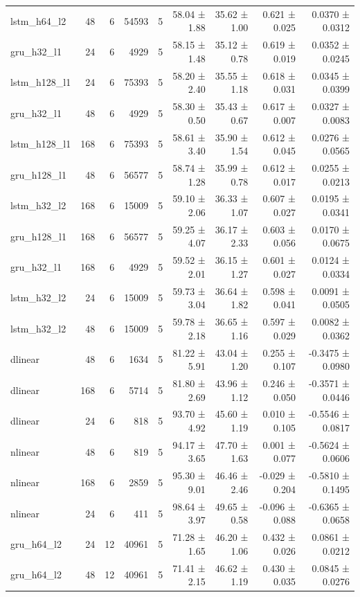 \begin{table}[htbp]
\begin{tabular}{lrrrrrrrr}
lstm\_h64\_l2 & 48 & 6 & 54593 & 5 & 58.04 ± 1.88 & 35.62 ± 1.00 & 0.621 ± 0.025 & 0.0370 ± 0.0312 \\
gru\_h32\_l1 & 24 & 6 & 4929 & 5 & 58.15 ± 1.48 & 35.12 ± 0.78 & 0.619 ± 0.019 & 0.0352 ± 0.0245 \\
lstm\_h128\_l1 & 24 & 6 & 75393 & 5 & 58.20 ± 2.40 & 35.55 ± 1.18 & 0.618 ± 0.031 & 0.0345 ± 0.0399 \\
gru\_h32\_l1 & 48 & 6 & 4929 & 5 & 58.30 ± 0.50 & 35.43 ± 0.67 & 0.617 ± 0.007 & 0.0327 ± 0.0083 \\
lstm\_h128\_l1 & 168 & 6 & 75393 & 5 & 58.61 ± 3.40 & 35.90 ± 1.54 & 0.612 ± 0.045 & 0.0276 ± 0.0565 \\
gru\_h128\_l1 & 48 & 6 & 56577 & 5 & 58.74 ± 1.28 & 35.99 ± 0.78 & 0.612 ± 0.017 & 0.0255 ± 0.0213 \\
lstm\_h32\_l2 & 168 & 6 & 15009 & 5 & 59.10 ± 2.06 & 36.33 ± 1.07 & 0.607 ± 0.027 & 0.0195 ± 0.0341 \\
gru\_h128\_l1 & 168 & 6 & 56577 & 5 & 59.25 ± 4.07 & 36.17 ± 2.33 & 0.603 ± 0.056 & 0.0170 ± 0.0675 \\
gru\_h32\_l1 & 168 & 6 & 4929 & 5 & 59.52 ± 2.01 & 36.15 ± 1.27 & 0.601 ± 0.027 & 0.0124 ± 0.0334 \\
lstm\_h32\_l2 & 24 & 6 & 15009 & 5 & 59.73 ± 3.04 & 36.64 ± 1.82 & 0.598 ± 0.041 & 0.0091 ± 0.0505 \\
lstm\_h32\_l2 & 48 & 6 & 15009 & 5 & 59.78 ± 2.18 & 36.65 ± 1.16 & 0.597 ± 0.029 & 0.0082 ± 0.0362 \\
dlinear & 48 & 6 & 1634 & 5 & 81.22 ± 5.91 & 43.04 ± 1.20 & 0.255 ± 0.107 & -0.3475 ± 0.0980 \\
dlinear & 168 & 6 & 5714 & 5 & 81.80 ± 2.69 & 43.96 ± 1.12 & 0.246 ± 0.050 & -0.3571 ± 0.0446 \\
dlinear & 24 & 6 & 818 & 5 & 93.70 ± 4.92 & 45.60 ± 1.19 & 0.010 ± 0.105 & -0.5546 ± 0.0817 \\
nlinear & 48 & 6 & 819 & 5 & 94.17 ± 3.65 & 47.70 ± 1.63 & 0.001 ± 0.077 & -0.5624 ± 0.0606 \\
nlinear & 168 & 6 & 2859 & 5 & 95.30 ± 9.01 & 46.46 ± 2.46 & -0.029 ± 0.204 & -0.5810 ± 0.1495 \\
nlinear & 24 & 6 & 411 & 5 & 98.64 ± 3.97 & 49.65 ± 0.58 & -0.096 ± 0.088 & -0.6365 ± 0.0658 \\
gru\_h64\_l2 & 24 & 12 & 40961 & 5 & 71.28 ± 1.65 & 46.20 ± 1.06 & 0.432 ± 0.026 & 0.0861 ± 0.0212 \\
gru\_h64\_l2 & 48 & 12 & 40961 & 5 & 71.41 ± 2.15 & 46.62 ± 1.19 & 0.430 ± 0.035 & 0.0845 ± 0.0276 \\

\end{tabular}
\end{table}
